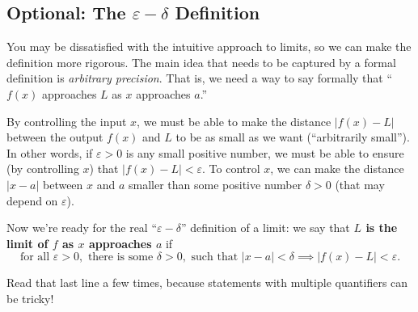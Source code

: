\documentclass{article}
\theoremstyle{definition}
\theoremstyle{definition}
\begin{document}
\subsection{Optional: The $\varepsilon-\delta$ Definition}

You may be dissatisfied with the intuitive approach to limits, so we can make the definition more rigorous. The main idea that needs to be captured by a formal definition is \textit{arbitrary precision}. That is, we need a way to say formally that ``$f(x)$ approaches $L$ as $x$ approaches $a$.''

By controlling the input $x$, we must be able to make the distance $|f(x)-L|$ between the output $f(x)$ and $L$ to be as small as we want (``arbitrarily small''). In other words, if $\varepsilon>0$ is any small positive number, we must be able to ensure (by controlling $x$) that $|f(x)-L| < \varepsilon$. To control $x$, we can make the distance $|x-a|$ between $x$ and $a$ smaller than some positive number $\delta > 0$ (that may depend on $\varepsilon$).

Now we're ready for the real ``$\varepsilon-\delta$'' definition of a limit: we say that \textbf{$L$ is the limit of $f$ as $x$ approaches $a$} if
$$\text{for all } \varepsilon > 0, \text{ there is some } \delta > 0, \text{ such that } |x - a| < \delta \implies |f(x) - L| <\varepsilon.$$

Read that last line a few times, because statements with multiple quantifiers can be tricky!
\end{document}
